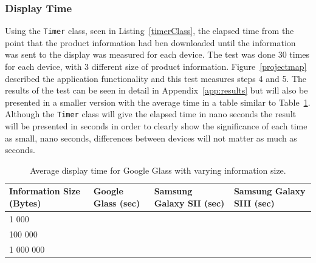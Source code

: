 \subsubsection{Display Time}

Using the \texttt{Timer} class, seen in Listing~\ref{timerClass}, the elapsed time from the point that the product information had ben downloaded until the information was sent to the display was measured for each device. The test was done 30 times for each device, with 3 different size of product information. Figure~\ref{projectmap} described the application functionality and this test measures steps 4 and 5. The results of the test can be seen in detail in Appendix~\ref{app:results} but will also be presented in a smaller version with the average time in a table similar to Table~\ref{tab:averageDisplaySpeedGoogleGlass}. Although the \texttt{Timer} class will give the elapsed time in nano seconds the result will be presented in seconds in order to clearly show the significance of each time as small, nano seconds, differences between devices will not matter as much as seconds.


	\begin{table}[ht!]
    		\caption{Average display time for Google Glass with varying information size.} \label{tab:averageDisplaySpeedGoogleGlass}
		\centering \begin{tabularx}{\textwidth}{l|X|X|X} \hline
		\textbf{Information Size (Bytes)} & \textbf{Google Glass (sec)}  & \textbf{Samsung Galaxy SII (sec)}  & \textbf{Samsung Galaxy SIII (sec)} \\ \hline \hline
       
		1 000		&	&	&	 \\ \hline
		100 000		&	&	&	 \\ \hline
		1 000 000		&	&	&	 \\ \hline

		\end{tabularx}
	\end{table}
